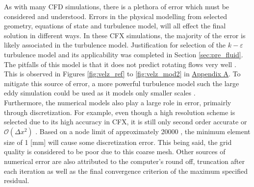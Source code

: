 As with many CFD simulations, there is a plethora of error which must be considered and understood. Errors in the physical modelling from selected geometry, equations of state and turbulence model, will all effect the final solution in different ways. In these CFX simulations, the majority of the error is likely associated in the turbulence model. Justification for selection of the $k-\varepsilon$ turbulence model and its applicability was completed in Section \ref{sec:pre_fluid}. The pitfalls of this model is that it does not predict rotating flows very well \cite{cfdbook}. This is observed in Figures \ref{fig:velz_ref} to \ref{fig:velz_mod2} in \hyperlink{appendixa}{Appendix A}. To mitigate this source of error, a more powerful turbulence model such the large eddy simulation could be used as it models only smaller scales \cite{cfdbook}.\\

Furthermore, the numerical models also play a large role in error, primairly through discretization. For example, even though a high resolution scheme is selected due to its high accuracy in CFX, it is still only second order accurate or $\mathcal{O} (\Delta x^2)$ \cite{cfdbook}. Based on a node limit of approximately 20000 \cite{proj}, the minimum element size of 1 [mm] will cause some discretization error. This being said, the grid quality is considered to be poor due to this coarse mesh. Other sources of numerical error are also attributed to the computer's round off, truncation after each iteration as well as the final convergence criterion of the maximum specified residual.
